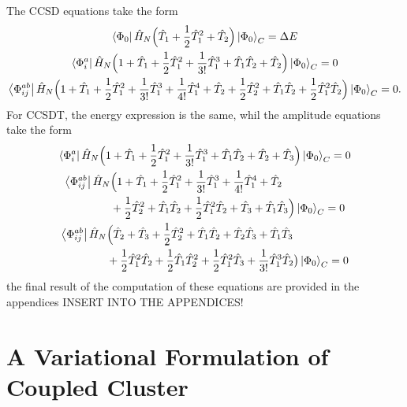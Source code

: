 The CCSD equations take the form 
\begin{gather}
    \bra{\Phi_0} \hat{H}_N
        \Big(\hat{T}_1 + \frac{1}{2}\hat{T}_1^2 + \hat{T}_2\Big)
    \ket{\Phi_0}_C = \Delta E \\
    \bra{\Phi^a_i} \hat{H}_N \Big(
        1 + \hat{T}_1 + \frac{1}{2}\hat{T}_1^2 + \frac{1}{3!}\hat{T}_1^3
        + \hat{T}_1\hat{T}_2 + \hat{T}_2
    \Big) \ket{\Phi_0}_C = 0 \\
    \bra{\Phi^{ab}_{ij}} \hat{H}_N \Big(
        1 + \hat{T}_1 + \frac{1}{2}\hat{T}_1^2 + \frac{1}{3!}\hat{T}_1^3
        + \frac{1}{4!}\hat{T}_1^4 + \hat{T}_2 + \frac{1}{2}\hat{T}_2^2
        + \hat{T}_1 \hat{T}_2 + \frac{1}{2}\hat{T}_1^2 \hat{T}_2
    \Big) \ket{\Phi_0}_C = 0.
\end{gather}
For CCSDT, the energy expression is the same, whil the amplitude equations take
the form 
\begin{gather}
    \bra{\Phi^a_i} \hat{H}_N \Big(
        1 + \hat{T}_1 + \frac{1}{2}\hat{T}_1^2 + \frac{1}{3!}\hat{T}_1^3
        + \hat{T}_1\hat{T}_2 + \hat{T}_2 + \hat{T}_3
    \Big) \ket{\Phi_0}_C = 0 \\
    \begin{aligned}
    \bra{\Phi^{ab}_{ij}} \hat{H}_N& \Big(
        1 + \hat{T}_1 + \frac{1}{2}\hat{T}_1^2 + \frac{1}{3!}\hat{T}_1^3
        + \frac{1}{4!}\hat{T}_1^4 + \hat{T}_2 \\ &+ \frac{1}{2}\hat{T}_2^2
        + \hat{T}_1 \hat{T}_2 + \frac{1}{2}\hat{T}_1^2 \hat{T}_2
        + \hat{T}_3 + \hat{T}_1\hat{T}_3
    \Big) \ket{\Phi_0}_C = 0  
    \end{aligned} \\
    \begin{aligned}
    \bra{\Phi^{ab}_{ij}} \hat{H}_N& \Big(
        \hat{T}_2 + \hat{T}_3 + \frac{1}{2}\hat{T}_2^2 + \hat{T}_1\hat{T}_2
        + \hat{T}_2\hat{T}_3 + \hat{T}_1\hat{T}_3 \\
        &+ \frac{1}{2}\hat{T}_1^2\hat{T}_2 + \frac{1}{2}\hat{T}_1\hat{T}_2^2
        + \frac{1}{2} \hat{T}_1^2\hat{T}_3 + \frac{1}{3!} \hat{T}_1^3 \hat{T}_2
    \big) \ket{\Phi_0}_C = 0  
    \end{aligned}
\end{gather}
the final result of the computation of these equations are provided in the 
appendices INSERT INTO THE APPENDICES!

\section{A Variational Formulation of Coupled Cluster}

